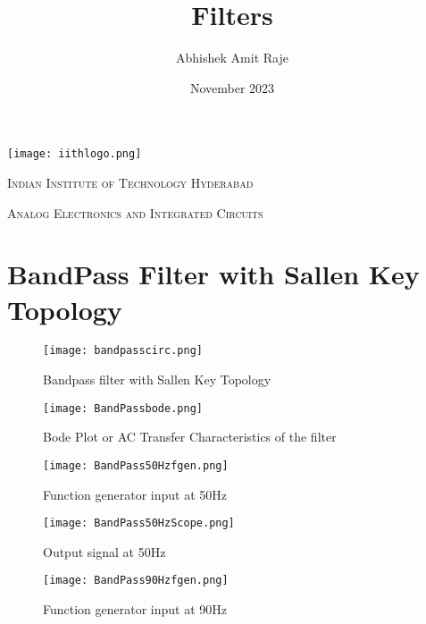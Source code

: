 \documentclass{article}
\title{Filters}
\author{Abhishek Amit Raje}
\date{November 2023}
\begin{document}
\begin{titlepage}
  \centering
  \texttt{[image: iithlogo.png]}\par\vspace{1cm}
  {\scshape\LARGE Indian Institute of Technology Hyderabad \par}
  \vspace{1cm}
  {\scshape\Large Analog Electronics and Integrated Circuits \par}
  \vspace{1.5cm}
  \maketitle
\end{titlepage}

\section{BandPass Filter with Sallen Key Topology}

\begin{figure}[ht]
  \centering
  \texttt{[image: bandpasscirc.png]}
  \caption{Bandpass filter with Sallen Key Topology}
  \label{fig:circuit_simulation}
\end{figure}

\begin{figure}[ht]
  \centering
  \texttt{[image: BandPassbode.png]}
  \caption{Bode Plot or AC Transfer Characteristics of the filter}
  \label{fig:bode_plot}
\end{figure}

\newpage

\begin{figure}[ht]
  \centering
  \texttt{[image: BandPass50Hzfgen.png]}
  \caption{Function generator input at 50Hz}
  \label{fig:input_50Hz}
\end{figure}

\begin{figure}[ht]
  \centering
  \texttt{[image: BandPass50HzScope.png]}
  \caption{Output signal at 50Hz}
  \label{fig:output_50Hz}
\end{figure}

\newpage

\begin{figure}[ht]
  \centering
  \texttt{[image: BandPass90Hzfgen.png]}
  \caption{Function generator input at 90Hz}
  \label{fig:input_90Hz}
\end{figure}
\end{document}
